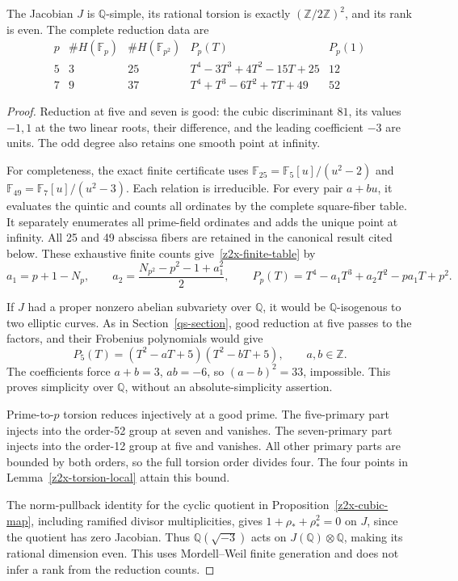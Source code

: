 \begin{theorem}
\label{z2x-finite-jacobian}
The Jacobian \(J\) is \(\mathbb Q\)-simple, its rational torsion
is exactly \((\mathbb Z/2\mathbb Z)^2\), and its rank is even.
The complete reduction data are
\begin{equation}
\begin{array}{c|rr|l|r}
 p&\#H(\mathbb F_p)&\#H(\mathbb F_{p^2})&
 P_p(T)&P_p(1)\\ \hline
 5&3&25&T^4-3T^3+4T^2-15T+25&12\\
 7&9&37&T^4+T^3-6T^2+7T+49&52
\end{array}
\label{z2x-finite-table}
\end{equation}
\end{theorem}
\begin{proof}
Reduction at five and seven is good: the cubic discriminant
\(81\), its values \(-1,1\) at the two linear roots, their
difference, and the leading coefficient \(-3\) are units.
The odd degree also retains one smooth point at infinity.

For completeness, the exact finite certificate uses
\(\mathbb F_{25}=\mathbb F_5[u]/(u^2-2)\) and
\(\mathbb F_{49}=\mathbb F_7[u]/(u^2-3)\). Each relation is
irreducible. For every pair \(a+bu\), it evaluates the quintic
and counts all ordinates by the complete square-fiber table.
It separately enumerates all prime-field ordinates and adds
the unique point at infinity. All 25 and 49 abscissa fibers
are retained in the canonical result cited below. These
exhaustive finite counts give~\eqref{z2x-finite-table} by
\[
 a_1=p+1-N_p,\qquad
 a_2=\frac{N_{p^2}-p^2-1+a_1^2}{2},\qquad
 P_p(T)=T^4-a_1T^3+a_2T^2-pa_1T+p^2.
\]

If \(J\) had a proper nonzero abelian subvariety over \(\mathbb Q\),
it would be \(\mathbb Q\)-isogenous to two elliptic curves.
As in Section~\ref{qs-section}, good reduction at five passes
to the factors, and their Frobenius polynomials would give
\[
 P_5(T)=(T^2-aT+5)(T^2-bT+5),\qquad a,b\in\mathbb Z.
\]
The coefficients force \(a+b=3\), \(ab=-6\), so
\((a-b)^2=33\), impossible. This proves simplicity over
\(\mathbb Q\), without an absolute-simplicity assertion.

Prime-to-\(p\) torsion reduces injectively at a good prime.
The five-primary part injects into the order-52 group at seven
and vanishes. The seven-primary part injects into the order-12
group at five and vanishes. All other primary parts are bounded
by both orders, so the full torsion order divides four. The
four points in Lemma~\ref{z2x-torsion-local} attain this bound.

The norm-pullback identity for the cyclic quotient in
Proposition~\ref{z2x-cubic-map}, including ramified divisor
multiplicities, gives \(1+\rho_*+\rho_*^2=0\) on \(J\), since
the quotient has zero Jacobian. Thus \(\mathbb Q(\sqrt{-3})\)
acts on \(J(\mathbb Q)\otimes\mathbb Q\), making its rational
dimension even. This uses Mordell--Weil finite generation and
does not infer a rank from the reduction counts.
\end{proof}

